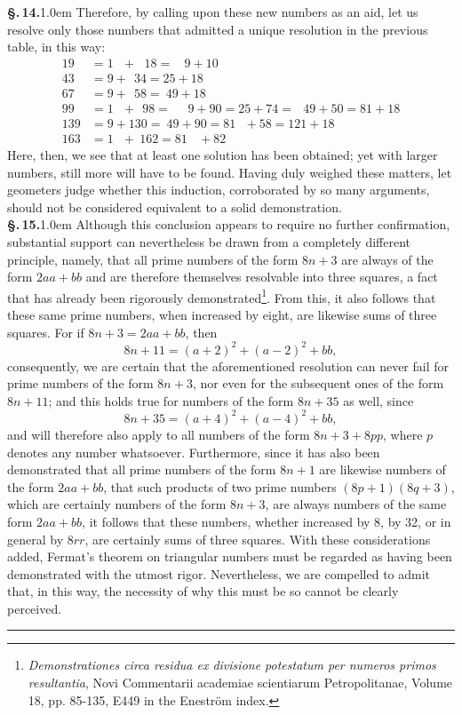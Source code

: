 \documentclass[12pt]{article}
\newcommand{\pnum}[1]{\textbf{\S.\,#1.}\kern1.0em}
\begin{document}
\pnum{14} Therefore, by calling upon these new numbers as an aid, let us resolve only those numbers that admitted a unique resolution in the previous table, in this way:
\begin{align*}
  19 &= 1 \ \ \! \! \ \! + \ \ \, 18 = \ \ \ \ \! \! 9 + 10 \\
  43 &= 9 + \ \  34= 25 + 18 \\
  67 &= 9 + \ \ 58 = \ \! 49 + 18 \\
  99 &= 1 \ \ \! \! \ \! + \ \ 98 = \ \ \ \ \! \! \ \! \ \! 9 + 90 = 25 + 74 = \ \ \! \ \! 49 + 50 = 81 + 18 \\
  139 &= 9 + 130 =  \ \! 49 + 90 = 81 \ \! \ \! \ \!  + 58 = 121 + 18 \\
  163 &= 1 \ \ \! \! \ \! + \ \! 162 = 81 \ \! \! \ \! \ \ \! + 82
\end{align*}
Here, then, we see that at least one solution has been obtained; yet with larger numbers, still more will have to be found. Having duly weighed these matters, let geometers judge whether this induction, corroborated by so many arguments, should not be considered equivalent to a solid demonstration. \\

\pnum{15} Although this conclusion appears to require no further confirmation, substantial support can nevertheless be drawn from a completely different principle, namely, that all prime numbers of the form $8n + 3$ are always of the form $2aa+bb$ and are therefore themselves resolvable into three squares, a fact that has already been rigorously demonstrated\footnote{\textit{Demonstrationes circa residua ex divisione potestatum per numeros primos resultantia}, Novi Commentarii academiae scientiarum Petropolitanae, Volume 18, pp. 85-135, E449 in the Eneström index.}. From this, it also follows that these same prime numbers, when increased by eight, are likewise sums of three squares. For if $8n + 3 = 2aa+bb$, then
$$8n+11 = (a+2)^2 + (a-2)^2 + bb,$$
consequently, we are certain that the aforementioned resolution can never fail for prime numbers of the form $8n + 3$, nor even for the subsequent ones of the form $8n + 11$; and this holds true for numbers of the form $8n + 35$ as well, since
$$8n+35 = (a+4)^2 + (a-4)^2 + bb,$$
and will therefore also apply to all numbers of the form $8n + 3 + 8pp$, where $p$ denotes any number whatsoever. Furthermore, since it has also been demonstrated that all prime numbers of the form $8n + 1$ are likewise numbers of the form $2aa + bb$, that such products of two prime numbers $(8p + 1)(8q + 3)$, which are
certainly numbers of the form $8n + 3$, are always numbers of the same form $2aa + bb$,
it follows that these numbers, whether increased by 8, by 32, or in general by
$8rr$, are certainly sums of three squares. With these considerations added,
Fermat's theorem on triangular numbers must be regarded as having been
demonstrated with the utmost rigor. Nevertheless, we are compelled to admit
that, in this way, the necessity of why this must be so cannot be clearly perceived.\\

\par\vspace{3.0ex}
{\centering\rule{0.56\textwidth}{2.6pt}\par}
\par\vspace{1.5ex}
\end{document}
